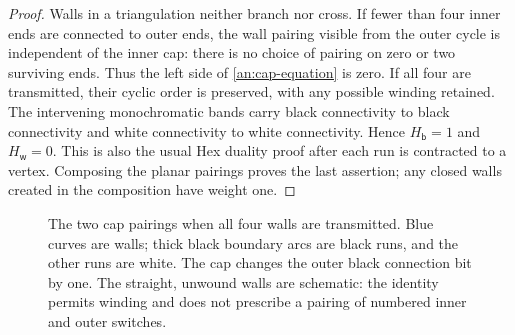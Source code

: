\begin{proof}
Walls in a triangulation neither branch nor cross.  If fewer than four
inner ends are connected to outer ends, the wall pairing visible from the
outer cycle is independent of the inner cap: there is no choice of pairing
on zero or two surviving ends.  Thus the left side of
\eqref{an:cap-equation} is zero.  If all four are transmitted, their cyclic
order is preserved, with any possible winding retained.  The intervening
monochromatic bands carry black connectivity to black connectivity and
white connectivity to white connectivity.  Hence $H_{\mathsf b}=1$ and
$H_{\mathsf w}=0$.  This is also the usual Hex duality proof after each run
is contracted to a vertex.  Composing the planar pairings proves the last
assertion; any closed walls created in the composition have weight one.
\end{proof}

\begin{figure}[tb]
\centering
{}
\caption{The two cap pairings when all four walls are transmitted.
Blue curves are walls; thick black boundary arcs are black runs, and the
other runs are white.  The cap changes the outer black connection bit by
one.  The straight, unwound walls are schematic: the identity permits
winding and does not prescribe a pairing of numbered inner and outer
switches.}\label{fig:annular-caps}
\end{figure}

